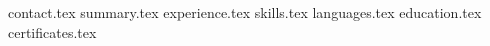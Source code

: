 \documentclass{resume} %
\begin{document}
{contact.tex}
{summary.tex}
{experience.tex}
{skills.tex}
{languages.tex}
{education.tex}
{certificates.tex}
\end{document}
